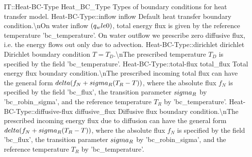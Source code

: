 \begin{SelectionType}
	{IT::Heat-BC-Type}
	{Heat{\_}BC{\_}Type}
	{{{Types of boundary conditions for heat transfer model.}%
}}
		\SelectionItem
			{Heat-BC-Type::inflow}
			{inflow}
			{{{Default heat transfer boundary condition.{\textbackslash}nOn water inflow }{$(q_w \\le 0)$}{, total energy flux is given by the reference temperature 'bc{\_}temperature'. On water outflow we prescribe zero diffusive flux, i.e. the energy flows out only due to advection.}%
}}
		\SelectionItem
			{Heat-BC-Type::dirichlet}
			{dirichlet}
			{{{Dirichlet boundary condition }{$T = T_D $}{.{\textbackslash}nThe prescribed temperature }{$T_D$}{ is specified by the field 'bc{\_}temperature'.}%
}}
		\SelectionItem
			{Heat-BC-Type::total-flux}
			{total{\_}flux}
			{{{Total energy flux boundary condition.{\textbackslash}nThe prescribed incoming total flux can have the general form }{$\\delta(f_N+\\sigma_R(T_R-T) )$}{, where the absolute flux }{$f_N$}{ is specified by the field 'bc{\_}flux', the transition parameter }{$\\sigma_R$}{ by 'bc{\_}robin{\_}sigma', and the reference temperature }{$T_R$}{ by 'bc{\_}temperature'.}%
}}
		\SelectionItem
			{Heat-BC-Type::diffusive-flux}
			{diffusive{\_}flux}
			{{{Diffusive flux boundary condition.{\textbackslash}nThe prescribed incoming energy flux due to diffusion can have the general form }{$\\delta(f_N+\\sigma_R(T_R-T) )$}{, where the absolute flux }{$f_N$}{ is specified by the field 'bc{\_}flux', the transition parameter }{$\\sigma_R$}{ by 'bc{\_}robin{\_}sigma', and the reference temperature }{$T_R$}{ by 'bc{\_}temperature'.}%
}}
\end{SelectionType}
